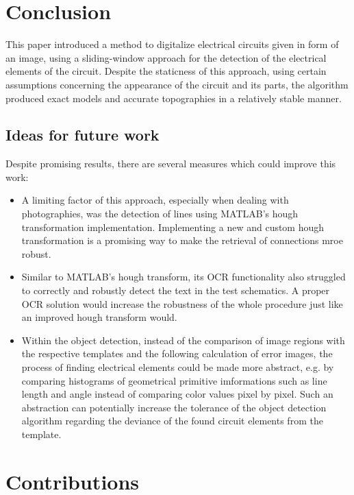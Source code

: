 \documentclass[10pt,twocolumn,letterpaper]{article}
\begin{document}

\section{Conclusion}

This paper introduced a method to digitalize electrical circuits given in form of an image, using a sliding-window approach for the detection of the electrical elements of the circuit. Despite the staticness of this approach, using certain assumptions concerning the appearance of the circuit and its parts, the algorithm produced exact models and accurate topographies in a relatively stable manner.

\subsection*{Ideas for future work}

Despite promising results, there are several measures which could improve this work:
\begin{itemize}
	\item A limiting factor of this approach, especially when dealing with photographies, was the detection of lines using MATLAB's hough transformation implementation. Implementing a new and custom hough transformation is a promising way to make the retrieval of connections mroe robust.
	\item Similar to MATLAB's hough transform, its OCR functionality also struggled to correctly and robustly detect the text in the test schematics. A proper OCR solution would increase the robustness of the whole procedure just like an improved hough transform would.
	\item Within the object detection, instead of the comparison of image regions with the respective templates and the following calculation of error images, the process of finding electrical elements could be made more abstract, e.g. by comparing histograms of geometrical primitive imformations such as line length and angle instead of comparing color values pixel by pixel. Such an abstraction can potentially increase the tolerance of the object detection algorithm regarding the deviance of the found circuit elements from the template.
\end{itemize}


\section*{Contributions}
\label{sec:contrib}
\end{document}
